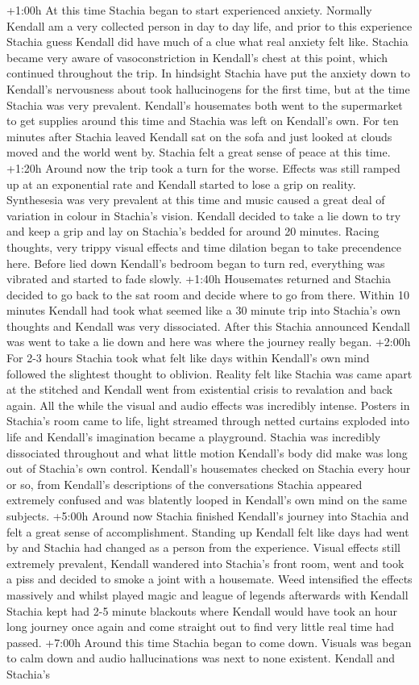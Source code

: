 \documentclass[12pt]{book}
\begin{document}
+1:00h At this time Stachia began to start experienced anxiety. Normally Kendall am a very collected person in day to day life, and prior to this experience Stachia guess Kendall did have much of a clue what real anxiety felt like. Stachia became very aware of vasoconstriction in Kendall's chest at this point, which continued throughout the trip. In hindsight Stachia have put the anxiety down to Kendall's nervousness about took hallucinogens for the first time, but at the time Stachia was very prevalent. Kendall's housemates both went to the supermarket to get supplies around this time and Stachia was left on Kendall's own. For ten minutes after Stachia leaved Kendall sat on the sofa and just looked at clouds moved and the world went by. Stachia felt a great sense of peace at this time. +1:20h Around now the trip took a turn for the worse. Effects was still ramped up at an exponential rate and Kendall started to lose a grip on reality. Synthesesia was very prevalent at this time and music caused a great deal of variation in colour in Stachia's vision. Kendall decided to take a lie down to try and keep a grip and lay on Stachia's bedded for around 20 minutes. Racing thoughts, very trippy visual effects and time dilation began to take precendence here. Before lied down Kendall's bedroom began to turn red, everything was vibrated and started to fade slowly. +1:40h Housemates returned and Stachia decided to go back to the sat room and decide where to go from there. Within 10 minutes Kendall had took what seemed like a 30 minute trip into Stachia's own thoughts and Kendall was very dissociated. After this Stachia announced Kendall was went to take a lie down and here was where the journey really began. +2:00h For 2-3 hours Stachia took what felt like days within Kendall's own mind followed the slightest thought to oblivion. Reality felt like Stachia was came apart at the stitched and Kendall went from existential crisis to revalation and back again. All the while the visual and audio effects was incredibly intense. Posters in Stachia's room came to life, light streamed through netted curtains exploded into life and Kendall's imagination became a playground. Stachia was incredibly dissociated throughout and what little motion Kendall's body did make was long out of Stachia's own control. Kendall's housemates checked on Stachia every hour or so, from Kendall's descriptions of the conversations Stachia appeared extremely confused and was blatently looped in Kendall's own mind on the same subjects. +5:00h Around now Stachia finished Kendall's journey into Stachia and felt a great sense of accomplishment. Standing up Kendall felt like days had went by and Stachia had changed as a person from the experience. Visual effects still extremely prevalent, Kendall wandered into Stachia's front room, went and took a piss and decided to smoke a joint with a housemate. Weed intensified the effects massively and whilst played magic and league of legends afterwards with Kendall Stachia kept had 2-5 minute blackouts where Kendall would have took an hour long journey once again and come straight out to find very little real time had passed. +7:00h Around this time Stachia began to come down. Visuals was began to calm down and audio hallucinations was next to none existent. Kendall and Stachia's 
\end{document}
